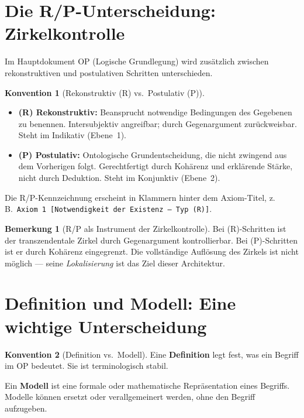 \documentclass[11pt,a4paper]{article}
\theoremstyle{plain}
\theoremstyle{definition}
\newtheorem{konvention}{Konvention}[section]
\newtheorem{remark}{Bemerkung}[section]
\begin{document}
\section{Die R/P-Unterscheidung: Zirkelkontrolle}

Im Hauptdokument OP (Logische Grundlegung) wird zus\"{a}tzlich zwischen
rekonstruktiven und postulativen Schritten unterschieden.

\begin{konvention}[Rekonstruktiv (R) vs.\ Postulativ (P)]
\begin{itemize}
  \item \textbf{(R) Rekonstruktiv:} Beansprucht notwendige Bedingungen des
        Gegebenen zu benennen. Intersubjektiv angreifbar; durch Gegenargument
        zur\"{u}ckweisbar. Steht im Indikativ (Ebene~1).
  \item \textbf{(P) Postulativ:} Ontologische Grundentscheidung, die nicht
        zwingend aus dem Vorherigen folgt. Gerechtfertigt durch Koh\"{a}renz und
        erkl\"{a}rende St\"{a}rke, nicht durch Deduktion. Steht im Konjunktiv
        (Ebene~2).
\end{itemize}
Die R/P-Kennzeichnung erscheint in Klammern hinter dem Axiom-Titel,
z.\,B.\ \texttt{Axiom 1 [Notwendigkeit der Existenz --- Typ (R)]}.
\end{konvention}

\begin{remark}[R/P als Instrument der Zirkelkontrolle]
Bei (R)-Schritten ist der transzendentale Zirkel durch Gegenargument
kontrollierbar. Bei (P)-Schritten ist er durch Koh\"{a}renz eingegrenzt.
Die vollst\"{a}ndige Aufl\"{o}sung des Zirkels ist nicht m\"{o}glich --- seine
\emph{Lokalisierung} ist das Ziel dieser Architektur.
\end{remark}

\section{Definition und Modell: Eine wichtige Unterscheidung}

\begin{konvention}[Definition vs.\ Modell]
Eine \textbf{Definition} legt fest, was ein Begriff im OP bedeutet. Sie ist
terminologisch stabil.

Ein \textbf{Modell} ist eine formale oder mathematische Repr\"{a}sentation
eines Begriffs. Modelle k\"{o}nnen ersetzt oder verallgemeinert werden, ohne
den Begriff aufzugeben.
\end{konvention}
\end{document}

